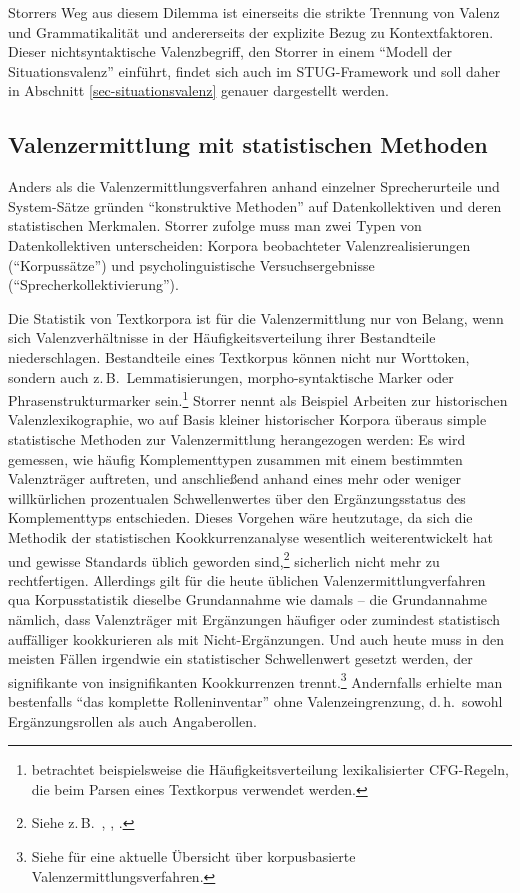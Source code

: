 Storrers Weg aus diesem Dilemma ist einerseits die strikte Trennung von Valenz und Grammatikalität und andererseits der explizite Bezug zu Kontextfaktoren. Dieser nichtsyntaktische Valenzbegriff, den Storrer in einem "`Modell der Situationsvalenz"' einführt, findet sich auch im STUG-Framework und soll daher in Abschnitt \ref{sec-situationsvalenz} genauer dargestellt werden. 




\subsection{Valenzermittlung mit statistischen Methoden} \label{sec-valenzermittlung-konstruktiv}

Anders als die Valenzermittlungsverfahren anhand einzelner Sprecherurteile und System-Sät\-ze gründen "`konstruktive Methoden"' \citep[228ff]{Storrer:92} auf Datenkollektiven und deren statistischen Merkmalen. Storrer zufolge muss man zwei Typen von Datenkollektiven unterscheiden: Korpora beobachteter Valenzrealisierungen ("`Korpussätze"') und psycholinguistische Versuchsergebnisse ("`Sprecherkollektivierung"'). 

Die Statistik von Textkorpora ist für die Valenzermittlung nur von Belang, wenn sich Valenzverhältnisse in der Häufigkeitsverteilung ihrer Bestandteile niederschlagen. Bestandteile eines Textkorpus können nicht nur Worttoken, sondern auch z.\,B.\ Lemmatisierungen, morpho-syntaktische Marker oder Phrasenstrukturmarker sein.\footnote{\cite{SchulteImWalde:02} betrachtet beispielsweise die Häufigkeitsverteilung lexikalisierter CFG-Regeln, die beim Parsen eines Textkorpus verwendet werden.} Storrer nennt als Beispiel Arbeiten zur historischen Valenzlexikographie, wo auf Basis kleiner historischer Korpora überaus simple statistische Methoden zur Valenzermittlung herangezogen werden: Es wird gemessen, wie häufig Komplementtypen zusammen mit einem bestimmten Valenzträger auftreten, und anschlie\ss end anhand eines mehr oder weniger willkürlichen prozentualen Schwellenwertes über den Ergänzungsstatus des Komplementtyps entschieden. Dieses Vorgehen wäre heutzutage, da sich die Methodik der statistischen Kookkurrenzanalyse wesentlich weiterentwickelt hat und gewisse Standards üblich geworden sind,\footnote{Siehe z.\,B.\ \cite{Lemnitzer:97}, \cite{Krenn:99}, \cite{Evert:05}.} sicherlich nicht mehr zu rechtfertigen. Allerdings gilt für die heute üblichen Valenzermittlungverfahren qua Korpusstatistik dieselbe Grundannahme wie damals -- die Grundannahme nämlich, dass Valenzträger mit Ergänzungen häufiger oder zumindest statistisch auffälliger kookkurieren als mit Nicht-Ergänzungen. Und auch heute muss in den meisten Fällen irgendwie ein statistischer Schwellenwert gesetzt werden, der signifikante von insignifikanten Kookkurrenzen trennt.\footnote{Siehe \cite{SchulteImWalde:09} für eine aktuelle Übersicht über korpusbasierte Valenzermittlungsverfahren.} Andernfalls erhielte man bestenfalls "`das komplette Rolleninventar"' \cite[232]{Storrer:92} ohne Valenzeingrenzung, d.\,h.\ sowohl Ergänzungsrollen als auch Angaberollen.

